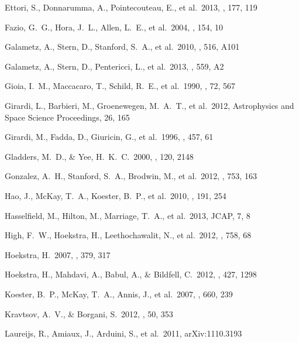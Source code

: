 \documentclass[apj,twocolumn]{emulateapj}
\begin{document}
{\begin{thebibliography}{88}
 Ettori, S., Donnarumma, A., Pointecouteau, E., et al.\ 2013, \ssr, 177, 119 

 Fazio, G.~G., Hora, J.~L., Allen, L.~E., et al.\ 2004, \apjs, 154, 10 

 Galametz, A., Stern, D., Stanford, S.~A., et al.\ 2010, \aap, 516, A101 

 Galametz, A., Stern, D., Pentericci, L., et al.\ 2013, \aap, 559, A2 

 Gioia, I.~M., Maccacaro, T., Schild, R.~E., et al.\ 1990, \apjs, 72, 567 

 Girardi, L., Barbieri, M., Groenewegen, M.~A.~T., et al.\ 2012, Astrophysics and Space Science Proceedings, 26, 165

 Girardi, M., Fadda, D., Giuricin, G., et al.\ 1996, \apj, 457, 61 

 Gladders, M.~D., \& Yee, H.~K.~C.\ 2000, \aj, 120, 2148 

 Gonzalez, A.~H., Stanford, S.~A., Brodwin, M., et al.\ 2012, \apj, 753, 163 

 Hao, J., McKay, T.~A., Koester, B.~P., et al.\ 2010, \apjs, 191, 254 

 Hasselfield, M., Hilton, M., Marriage, T.~A., et al.\ 2013, JCAP, 7, 8 

 High, F.~W., Hoekstra, H., Leethochawalit, N., et al.\ 2012, \apj, 758, 68 

 Hoekstra, H.\ 2007, \mnras, 379, 317 

 Hoekstra, H., Mahdavi, A., Babul, A., \& Bildfell, C.\ 2012, \mnras, 427, 1298 

 Koester, B.~P., McKay, T.~A., Annis, J., et al.\ 2007, \apj, 660, 239 

 Kravtsov, A.~V., \& Borgani, S.\ 2012, \araa, 50, 353 

 Laureijs, R., Amiaux, J., Arduini, S., et al.\ 2011, arXiv:1110.3193 


\end{thebibliography}}
\end{document}
